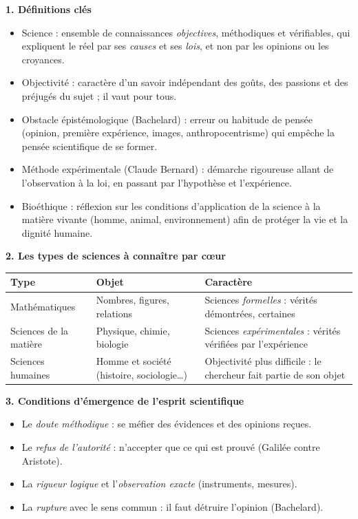 \documentclass[11pt]{article}
\newcommand{\cle}[1]{{\popxbold\color{popdark}#1}}
\begin{document}
\begin{bilan}
\textbf{1. D\'efinitions cl\'es}
\begin{itemize}
\item \cle{Science} : ensemble de connaissances \emph{objectives}, m\'ethodiques et v\'erifiables, qui expliquent le r\'eel par ses \emph{causes} et ses \emph{lois}, et non par les opinions ou les croyances.
\item \cle{Objectivit\'e} : caract\`ere d'un savoir ind\'ependant des go\^uts, des passions et des pr\'ejug\'es du sujet ; il vaut pour tous.
\item \cle{Obstacle \'epist\'emologique} (Bachelard) : erreur ou habitude de pens\'ee (opinion, premi\`ere exp\'erience, images, anthropocentrisme) qui emp\^eche la pens\'ee scientifique de se former.
\item \cle{M\'ethode exp\'erimentale} (Claude Bernard) : d\'emarche rigoureuse allant de l'observation \`a la loi, en passant par l'hypoth\`ese et l'exp\'erience.
\item \cle{Bio\'ethique} : r\'eflexion sur les conditions d'application de la science \`a la mati\`ere vivante (homme, animal, environnement) afin de prot\'eger la vie et la dignit\'e humaine.
\end{itemize}

\textbf{2. Les types de sciences \`a conna\^itre par c\oe ur}
\begin{center}
\begin{tabularx}{\linewidth}{|l|X|X|}\hline
\rowcolor{popblueL} \textbf{Type} & \textbf{Objet} & \textbf{Caract\`ere} \\ \hline
Math\'ematiques & Nombres, figures, relations & Sciences \emph{formelles} : v\'erit\'es d\'emontr\'ees, certaines \\ \hline
Sciences de la mati\`ere & Physique, chimie, biologie & Sciences \emph{exp\'erimentales} : v\'erit\'es v\'erifi\'ees par l'exp\'erience \\ \hline
Sciences humaines & Homme et soci\'et\'e (histoire, sociologie\ldots) & Objectivit\'e plus difficile : le chercheur fait partie de son objet \\ \hline
\end{tabularx}
\end{center}

\textbf{3. Conditions d'\'emergence de l'esprit scientifique}
\begin{itemize}
\item Le \emph{doute m\'ethodique} : se m\'efier des \'evidences et des opinions re\c{c}ues.
\item Le \emph{refus de l'autorit\'e} : n'accepter que ce qui est prouv\'e (Galil\'ee contre Aristote).
\item La \emph{rigueur logique} et l'\emph{observation exacte} (instruments, mesures).
\item La \emph{rupture} avec le sens commun : \og il faut d\'etruire l'opinion \fg{} (Bachelard).
\end{itemize}


\end{bilan}
\end{document}
